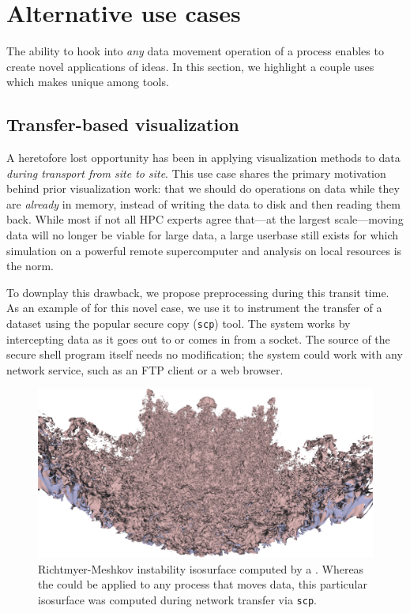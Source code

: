 \section{Alternative use cases}
\label{sec:novel}

The ability to hook into \emph{any} data movement operation of a
process enables \freeprocessing{} to create novel applications of
\insitu{} ideas.  In this section, we highlight a couple uses which
makes
\freeprocessing{} unique among \insitu{} tools.

\subsection{Transfer-based visualization}

A heretofore lost opportunity has been in applying visualization
methods to data \emph{during transport from site to site}.  This use
case shares
the primary motivation behind prior \insitu{} visualization work: that
we should do
operations on data while they are \emph{already} in memory, instead of
writing the data to disk and then reading them back. While most if not
all HPC experts agree that---at the largest scale---moving data will
no longer be viable for large data, a large userbase still exists for
which simulation on a powerful remote supercomputer and analysis on
local resources is the norm.

To downplay this drawback, we propose preprocessing during this transit
time.  As an
example of \freeprocessing{} for this novel case, we use it to
instrument the transfer of a dataset using the popular secure copy
(\texttt{scp}) tool.  The system works by intercepting data as it goes
out to or comes in from a socket.  The source of the secure shell
program itself needs no modification; the system could work with any
network service, such as an FTP client or a web browser.

\begin{figure}
  \centering
  \includegraphics[width=\linewidth]{images/fp/rmeshkov-iso}

  \caption{Richtmyer-Meshkov instability isosurface computed by a
  \freeprocessor{}.  Whereas the \freeprocessor{} could be applied to
  any process that moves data, this particular isosurface was computed
  during network transfer via \texttt{scp}.}

  \label{fig:rm-iso}
\end{figure}

